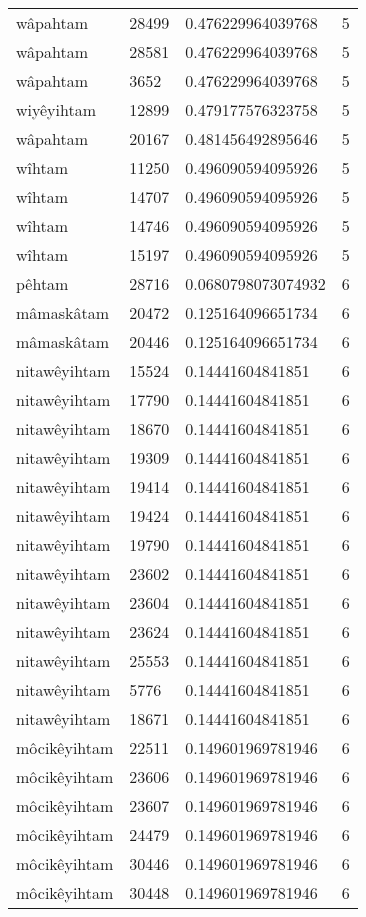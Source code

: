 \begin{longtable}{llll}
wâpahtam & 28499 & 0.476229964039768 & 5 \\
wâpahtam & 28581 & 0.476229964039768 & 5 \\
wâpahtam & 3652 & 0.476229964039768 & 5 \\
wiyêyihtam & 12899 & 0.479177576323758 & 5 \\
wâpahtam & 20167 & 0.481456492895646 & 5 \\
wîhtam & 11250 & 0.496090594095926 & 5 \\
wîhtam & 14707 & 0.496090594095926 & 5 \\
wîhtam & 14746 & 0.496090594095926 & 5 \\
wîhtam & 15197 & 0.496090594095926 & 5 \\
pêhtam & 28716 & 0.0680798073074932 & 6 \\
mâmaskâtam & 20472 & 0.125164096651734 & 6 \\
mâmaskâtam & 20446 & 0.125164096651734 & 6 \\
nitawêyihtam & 15524 & 0.14441604841851 & 6 \\
nitawêyihtam & 17790 & 0.14441604841851 & 6 \\
nitawêyihtam & 18670 & 0.14441604841851 & 6 \\
nitawêyihtam & 19309 & 0.14441604841851 & 6 \\
nitawêyihtam & 19414 & 0.14441604841851 & 6 \\
nitawêyihtam & 19424 & 0.14441604841851 & 6 \\
nitawêyihtam & 19790 & 0.14441604841851 & 6 \\
nitawêyihtam & 23602 & 0.14441604841851 & 6 \\
nitawêyihtam & 23604 & 0.14441604841851 & 6 \\
nitawêyihtam & 23624 & 0.14441604841851 & 6 \\
nitawêyihtam & 25553 & 0.14441604841851 & 6 \\
nitawêyihtam & 5776 & 0.14441604841851 & 6 \\
nitawêyihtam & 18671 & 0.14441604841851 & 6 \\
môcikêyihtam & 22511 & 0.149601969781946 & 6 \\
môcikêyihtam & 23606 & 0.149601969781946 & 6 \\
môcikêyihtam & 23607 & 0.149601969781946 & 6 \\
môcikêyihtam & 24479 & 0.149601969781946 & 6 \\
môcikêyihtam & 30446 & 0.149601969781946 & 6 \\
môcikêyihtam & 30448 & 0.149601969781946 & 6 \\

\end{longtable}
